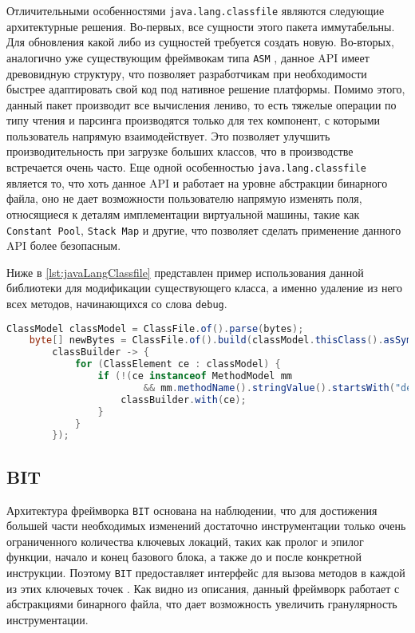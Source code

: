Отличительными особенностями \texttt{java.lang.classfile} являются следующие архитектурные решения. Во-первых, все сущности этого пакета иммутабельны. Для обновления какой либо из сущностей требуется создать новую. Во-вторых, аналогично уже существующим фреймвокам типа \texttt{ASM} \cite{asm}, данное API имеет древовидную структуру, что позволяет разработчикам при необходимости быстрее адаптировать свой код под нативное решение платформы. Помимо этого, данный пакет производит все вычисления лениво, то есть тяжелые операции по типу чтения и парсинга производятся только для тех компонент, с которыми пользователь напрямую взаимодействует. Это позволяет улучшить производительность при загрузке больших классов, что в производстве встречается очень часто. Еще одной особенностью \texttt{java.lang.classfile} является то, что хоть данное API и работает на уровне абстракции бинарного файла, оно не дает возможности пользователю напрямую изменять поля, относящиеся к деталям имплементации виртуальной машины, такие как \texttt{Constant~Pool}, \texttt{Stack~Map} и другие, что позволяет сделать применение данного API более безопасным.

Ниже в \autoref{lst:javaLangClassfile} представлен пример использования данной библиотеки для модификации существующего класса, а именно удаление из него всех методов, начинающихся со слова \texttt{debug}.

\begin{lstlisting}[language=Java, caption=Удаление методов отладки из класса при помощи библиотеки \texttt{java.lang.classfile}, label=lst:javaLangClassfile]
    ClassModel classModel = ClassFile.of().parse(bytes);
    byte[] newBytes = ClassFile.of().build(classModel.thisClass().asSymbol(),
        classBuilder -> {
            for (ClassElement ce : classModel) {
                if (!(ce instanceof MethodModel mm
                        && mm.methodName().stringValue().startsWith("debug"))) {
                    classBuilder.with(ce);
                }
            }
        });
\end{lstlisting}

\subsection{BIT}

Архитектура фреймворка \texttt{BIT} основана на наблюдении, что для достижения большей части необходимых изменений достаточно инструментации только очень ограниченного количества ключевых локаций, таких как пролог и эпилог функции, начало и конец базового блока, а также до и после конкретной инструкции. Поэтому \texttt{BIT} предоставляет интерфейс для вызова методов в каждой из этих ключевых точек \cite{bit}. Как видно из описания, данный фреймворк работает с абстракциями бинарного файла, что дает возможность увеличить гранулярность инструментации.

